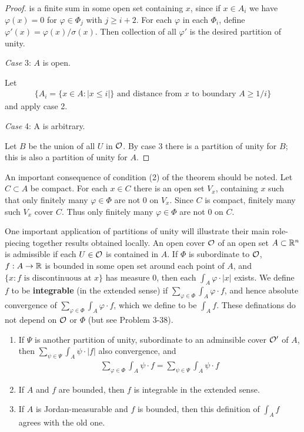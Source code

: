 \begin{proof}
    is a finite sum in some open set containing $x$, since if $x\in A_i$ we have 
    $\varphi(x) = 0$ for $\varphi\in \Phi_j$ with $j\ge i+2$. For each $\varphi$ in 
    each $\Phi_i$, define $\varphi'(x) = \varphi(x)/\sigma(x)$. Then collection of 
    all $\varphi'$ is the desired partition of unity.

    \textit{Case} 3: $A$ is open.\par
    Let 
    \begin{align*}
        \{A_i = \{x\in A:|x\le i|\} \text{ and distance from } x \text{ to boundary } A\ge 1/i\}
    \end{align*}
    and apply case 2.

    \textit{Case} 4: A is arbitrary.\par
    Let $B$ be the union of all $U$ in $\mathcal{O}$. By case 3 there is a partition of unity for
    $B$; this is also a partition of unity for $A$.
\end{proof}


An important consequence of condition (2) of the theorem
should be noted. Let $C \subset A$ be compact. For each $x \in C$
there is an open set $V_x$, containing $x$ such that only finitely
many $\varphi\in \Phi$ are not 0 on $V_x$. Since $C$ is compact, finitely
many such $V_x$ cover $C$. Thus only finitely many $\varphi\in\Phi$ are
not 0 on $C$. 

One important application of partitions of unity will 
illustrate their main role-piecing together results obtained locally.
An open cover $\mathcal{O}$ of an open set $A \subset \mathbb{R}^n$ is admissible if
each $U \in \mathcal{O}$ is contained in $A$. If $\Phi$ is subordinate to $\mathcal{O}$,
$f: A\to \mathbb{R}$ is bounded in some open set around each point of $A$,
and $\{x: f \text{ is discontinuous at } x\}$ has measure 0, then each
$\int_A\varphi\cdot |x|$ exists. We define $f$ to be \textbf{integrable} (in the extended
sense) if $\sum_{\varphi\in\Phi}^{}{\int_A\varphi\cdot f}$, and hence absolute convergence
of $\sum_{\varphi\in\Phi}^{}{\int_A\varphi\cdot f}$, which we define to be $\int_A f$. These 
definations do not depend on $\mathcal{O}$ or $\Phi$ (but see Problem 3-38).

\begin{theorem}
    \begin{enumerate}[label=\upshape{(\arabic*)}]
        \item If $\Psi$ is another partition of unity, subordinate to an adminsible cover $\mathcal{O}'$ of 
            $A$, then $\sum_{\psi\in\Psi}^{}{\int_A\psi\cdot |f|}$ also convergence, and 
            \begin{align*}
                \sum_{\varphi\in\Phi}^{}{\int_A\psi\cdot f} = \sum_{\psi\in\Psi}^{}{\int_A \psi\cdot f}
            \end{align*}
        \item If $A$ and $f$ are bounded, then $f$ is integrable in the extended sense.
        \item If $A$ is Jordan-measurable and $f$ is bounded, then this definition 
            of $\int_A f$ agrees with the old one.
    \end{enumerate}
\end{theorem}

